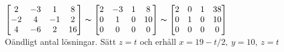$\begin{bmatrix}
2&-3&1&8\\
-2&4&-1&2\\
4&-6&2&16
\end{bmatrix}\thicksim
\begin{bmatrix}
2&-3&1&8\\
0&1&0&10\\
0&0&0&0
\end{bmatrix}\thicksim
\begin{bmatrix}
2&0&1&38\\
0&1&0&10\\
0&0&0&0
\end{bmatrix}
$\\ Oändligt antal lösningar. Sätt $z=t$ och erhåll $x=19-t/2,\ y=10,\ z=t$